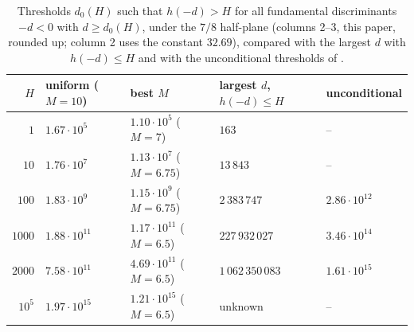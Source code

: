 \documentclass[11pt]{article}
\theoremstyle{definition}
\theoremstyle{remark}
\numberwithin{equation}{section}
\begin{document}
\begin{table}[ht]
\centering\footnotesize
\caption{Thresholds $d_0(H)$ such that $h(-d)>H$ for all fundamental discriminants $-d<0$ with $d\ge d_0(H)$, under the $7/8$ half-plane (columns 2--3, this paper, rounded up; column 2 uses the constant $32.69$), compared with the largest $d$ with $h(-d)\le H$ \cite{watkins2004,kimura2026} and with the unconditional thresholds of \cite[Table~1]{kimura2026}.}\label{tab:thr}
\begin{tabular}{rllll}
\toprule
$H$ & uniform ($M=10$) & best $M$ & largest $d$, $h(-d)\le H$ & unconditional \cite{kimura2026}\\
\midrule
$1$ & $1.67\cdot10^{5}$ & $1.10\cdot10^{5}$ ($M=7$) & $163$ & --\\
$10$ & $1.76\cdot10^{7}$ & $1.13\cdot10^{7}$ ($M=6.75$) & $13\,843$ & --\\
$100$ & $1.83\cdot10^{9}$ & $1.15\cdot10^{9}$ ($M=6.75$) & $2\,383\,747$ & $2.86\cdot10^{12}$\\
$1000$ & $1.88\cdot10^{11}$ & $1.17\cdot10^{11}$ ($M=6.5$) & $227\,932\,027$ & $3.46\cdot10^{14}$\\
$2000$ & $7.58\cdot10^{11}$ & $4.69\cdot10^{11}$ ($M=6.5$) & $1\,062\,350\,083$ & $1.61\cdot10^{15}$\\
$10^5$ & $1.97\cdot10^{15}$ & $1.21\cdot10^{15}$ ($M=6.5$) & unknown & --\\
\bottomrule
\end{tabular}
\end{table}
\end{document}
